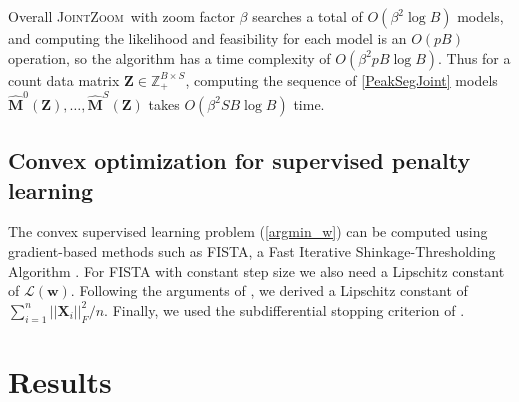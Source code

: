 \documentclass{article} %
\newcommand{\ZZ}{\mathbb Z}
\newcommand{\JointHeuristic}{\textsc{JointZoom}}
\begin{document}
Overall \JointHeuristic\ with zoom factor $\beta$ searches a total of
$O(\beta^2\log B)$ models, and computing the likelihood and
feasibility for each model is an $O(pB)$ operation, so the algorithm
has a time complexity of $O(\beta^2 pB\log B)$. Thus for a count data
matrix $\mathbf Z\in\ZZ_+^{B\times S}$, computing the sequence of
\ref{PeakSegJoint} models $\mathbf{\hat M}^0(\mathbf Z), \dots,
\mathbf{\hat M}^S(\mathbf Z)$ takes $O(\beta^2 S B\log B)$ time.

\subsection{Convex optimization for supervised penalty learning}


The convex supervised learning problem (\ref{argmin_w}) can be
computed using gradient-based methods such as FISTA, a Fast Iterative
Shinkage-Thresholding Algorithm \citep{fista}. 
For FISTA with constant step size we also need a Lipschitz constant of
$\mathcal L(\mathbf w)$. Following the arguments of
\citet{hingeSquareFISTA}, we derived a Lipschitz constant of
$\sum_{i=1}^n ||\mathbf X_i||_F^2/n$. Finally, we used the
subdifferential stopping criterion of \citet{HOCKING-penalties}.


\section{Results}
\end{document}
